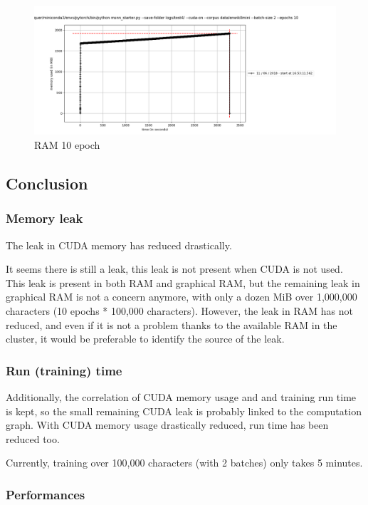 \begin{figure}[h]
\centering
\includegraphics{parts/appendix/reports-gmsnn/docs_esteban-latex/test_reports/2018-06-12/history_RAM.png}
\caption{RAM 10 epoch}
\end{figure}

\subsection{Conclusion}

\subsubsection{Memory leak}

The leak in CUDA memory has reduced drastically.

It seems there is still a leak, this leak is not present when CUDA is
not used. This leak is present in both RAM and graphical RAM, but the
remaining leak in graphical RAM is not a concern anymore, with only a
dozen MiB over 1,000,000 characters (10 epochs * 100,000 characters).
However, the leak in RAM has not reduced, and even if it is not a
problem thanks to the available RAM in the cluster, it would be
preferable to identify the source of the leak.

\subsubsection{Run (training) time}

Additionally, the correlation of CUDA memory usage and and training run
time is kept, so the small remaining CUDA leak is probably linked to the
computation graph. With CUDA memory usage drastically reduced, run time
has been reduced too.

Currently, training over 100,000 characters (with 2 batches) only takes
5 minutes.

\subsubsection{Performances}

